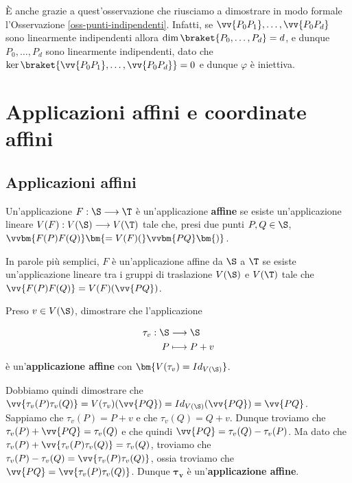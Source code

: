 \documentclass[11pt, a4paper, titlepage, oneside]{scrbook}
\begin{document}
È anche grazie a quest'osservazione che riusciamo a dimostrare in modo formale l'Osservazione \ref{oss-punti-indipendenti}. Infatti, se $\vv{P_0P_1},\ldots,\vv{P_0P_d}$ sono linearmente indipendenti allora $\dim \braket{P_0,\ldots,P_d} = d$, e dunque $P_0,\ldots,P_d$ sono linearmente indipendenti, dato che $\ker \braket{\vv{P_0P_1},\ldots,\vv{P_0P_d}} = 0$ e dunque $\varphi$ è iniettiva. 

\section{Applicazioni affini e coordinate affini}
\subsection{Applicazioni affini}

\begin{Definizione}
\label{def-applicazione-affine}
Un'applicazione $F: \S \longrightarrow \T$ è un'applicazione \textbf{affine} se esiste un'applicazione lineare $V(F): V(\S) \longrightarrow V(\T)$ tale che, presi due punti $P,Q \in \S$, $\vvbm{F(P) F(Q)} \bm{= V(F)(}\vvbm{PQ}\bm{)}$.
\end{Definizione}

In parole più semplici, $F$ è un'applicazione affine da $\S$ a $\T$ se esiste un'applicazione lineare tra i gruppi di traslazione $V(\S)$ e $V(\T)$ tale che $\vv{F(P)F(Q)} = V(F)(\vv{PQ})$.

\Esempio \nopagebreak

Preso $v \in V(\S)$, dimostrare che l'applicazione \nopagebreak

\begin{align*}
\tau_v: \S &\longrightarrow \S  \\
P &\longmapsto P + v
\end{align*}
è un'\textbf{applicazione affine} con $\bm{V(\tau_v) = Id_{V(\S)}}$. \nopagebreak

Dobbiamo quindi dimostrare che $\vv{\tau_v (P) \tau_v(Q)} = V(\tau_v)(\vv{PQ}) = Id_{V(\S)}(\vv{PQ}) = \vv{PQ}$. Sappiamo che $\tau_v(P) = P + v$ e che $\tau_v(Q) = Q + v$. Dunque troviamo che $\tau_v(P) + \vv{PQ} = \tau_v(Q)$ e che quindi $\vv{PQ} = \tau_v(Q) - \tau_v(P)$. Ma dato che $\tau_v (P) + \vv{\tau_v(P) \tau_v(Q)} = \tau_v(Q)$, troviamo che \mbox{$\tau_v(P) - \tau_v(Q) = \vv{\tau_v(P) \tau_v(Q)}$}, ossia troviamo che $\vv{PQ} = \vv{\tau_v (P) \tau_v(Q)}$. Dunque $\bm{\tau_v}$ è un'\textbf{applicazione affine}.
\end{document}
